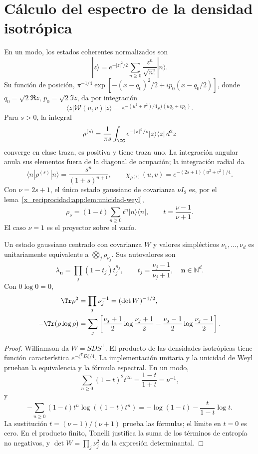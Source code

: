 \section{Cálculo del espectro de la densidad isotrópica}
En un modo, los estados coherentes normalizados son
\[
 |z\rangle=e^{-|z|^2/2}\sum_{n\geq0}\frac{z^n}{\sqrt{n!}}|n\rangle.
\]
Su función de posición,
\(\pi^{-1/4}\exp[-(x-q_0)^2/2+ip_0(x-q_0/2)]\), donde
\(q_0=\sqrt2\Re z\), \(p_0=\sqrt2\Im z\), da por integración
\[
 \langle z|\mathcal W(u,v)|z\rangle
 =e^{-(u^2+v^2)/4}e^{i(uq_0+vp_0)}.
\]
Para \(s>0\), la integral
\[
 \rho^{(s)}=\frac1{\pi s}\int_{\CC} e^{-|z|^2/s}
 |z\rangle\langle z|\,d^2z
\]
converge en clase traza, es positiva y tiene traza uno. La integración
angular anula sus elementos fuera de la diagonal de ocupación; la
integración radial da
\[
 \langle n|\rho^{(s)}|n\rangle=\frac{s^n}{(1+s)^{n+1}},\qquad
 \chi_{\rho^{(s)}}(u,v)=e^{-(2s+1)(u^2+v^2)/4}.
\]
Con \(\nu=2s+1\), el único estado gaussiano de covarianza
\(\nu I_2\) es, por el lema~\ref{x_reciprocidad:app:lem:unicidad-weyl},
\begin{equation}
 \rho_\nu=(1-t)\sum_{n\geq0}t^n|n\rangle\langle n|,
 \qquad t=\frac{\nu-1}{\nu+1}.
 \label{x_reciprocidad:app:eq:estado-geometrico}
\end{equation}
El caso \(\nu=1\) es el proyector sobre el vacío.

\begin{theorem}
\label{x_reciprocidad:app:thm:espectro-gaussiano}
Un estado gaussiano centrado con covarianza \(W\) y valores
simplécticos \(\nu_1,\ldots,\nu_d\) es unitariamente equivalente
a \(\bigotimes_j\rho_{\nu_j}\). Sus autovalores son
\[
 \lambda_{\symbf{n}}=\prod_j(1-t_j)t_j^{n_j},\qquad
 t_j=\frac{\nu_j-1}{\nu_j+1},\quad \symbf{n}\in\mathbb N^d.
\]
Con \(0\log0=0\),
\begin{align}
 \Tr\rho^2&=\prod_j\nu_j^{-1}=(\det W)^{-1/2},
 \label{x_reciprocidad:app:eq:pureza-general}\\
 -\Tr(\rho\log\rho)&=\sum_j
 \left[\frac{\nu_j+1}{2}\log\frac{\nu_j+1}{2}
 -\frac{\nu_j-1}{2}\log\frac{\nu_j-1}{2}\right].
 \label{x_reciprocidad:app:eq:entropia-general}
\end{align}
\end{theorem}
\begin{proof}
Williamson da \(W=SDS^{\mathsf T}\). El producto de las densidades
isotrópicas tiene función característica \(e^{-\xi^{\mathsf T}D\xi/4}\).
La implementación unitaria y la unicidad de Weyl prueban la
equivalencia y la fórmula espectral. En un modo,
\[
 \sum_{n\geq0}(1-t)^2t^{2n}=\frac{1-t}{1+t}=\nu^{-1},
\]
y
\[
 -\sum_{n\geq0}(1-t)t^n\log((1-t)t^n)
 =-\log(1-t)-\frac{t}{1-t}\log t.
\]
La sustitución \(t=(\nu-1)/(\nu+1)\) prueba las fórmulas; el
límite en \(t=0\) es cero. En el producto finito, Tonelli justifica
la suma de los términos de entropía no negativos, y
\(\det W=\prod_j\nu_j^2\) da la expresión determinantal.
\end{proof}

